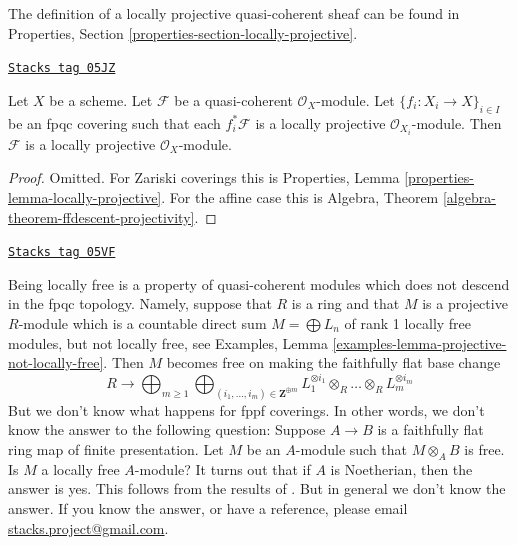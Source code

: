 The definition of a locally projective quasi-coherent sheaf can be found in
Properties, Section \ref{properties-section-locally-projective}.

\begin{lemma}
\label{descent-lemma-locally-projective-descends}
\href{https://stacks.math.columbia.edu/tag/05JZ}{\texttt{Stacks tag 05JZ}}

Let $X$ be a scheme.
Let $\mathcal{F}$ be a quasi-coherent $\mathcal{O}_X$-module.
Let $\{f_i : X_i \to X\}_{i \in I}$ be an fpqc covering such that
each $f_i^*\mathcal{F}$ is a locally projective $\mathcal{O}_{X_i}$-module.
Then $\mathcal{F}$ is a locally projective $\mathcal{O}_X$-module.
\end{lemma}

\begin{proof}
Omitted. For Zariski coverings this is
Properties, Lemma \ref{properties-lemma-locally-projective}.
For the affine case this is
Algebra, Theorem \ref{algebra-theorem-ffdescent-projectivity}.
\end{proof}

\begin{remark}
\label{descent-remark-locally-free-descends}
\href{https://stacks.math.columbia.edu/tag/05VF}{\texttt{Stacks tag 05VF}}

Being locally free is a property of quasi-coherent modules which
does not descend in the fpqc topology. Namely, suppose that
$R$ is a ring and that $M$ is a projective $R$-module which is
a countable direct sum $M = \bigoplus L_n$ of rank 1 locally
free modules, but not locally free, see
Examples, Lemma \ref{examples-lemma-projective-not-locally-free}.
Then $M$ becomes free on making the faithfully flat base change
$$
R \longrightarrow
\bigoplus\nolimits_{m \geq 1}
\bigoplus\nolimits_{(i_1, \ldots, i_m) \in \mathbf{Z}^{\oplus m}}
L_1^{\otimes i_1} \otimes_R \ldots \otimes_R L_m^{\otimes i_m}
$$
But we don't know what happens for fppf coverings. In other words,
we don't know the answer to the following question:
Suppose $A \to B$ is a faithfully
flat ring map of finite presentation. Let $M$ be an $A$-module
such that $M \otimes_A B$ is free. Is $M$ a locally free
$A$-module? It turns out that if $A$ is Noetherian, then the answer
is yes. This follows from the results of \cite{Bass}. But in general
we don't know the answer. If you know the answer, or have a reference,
please email
\href{mailto:stacks.project@gmail.com}{stacks.project@gmail.com}.
\end{remark}

